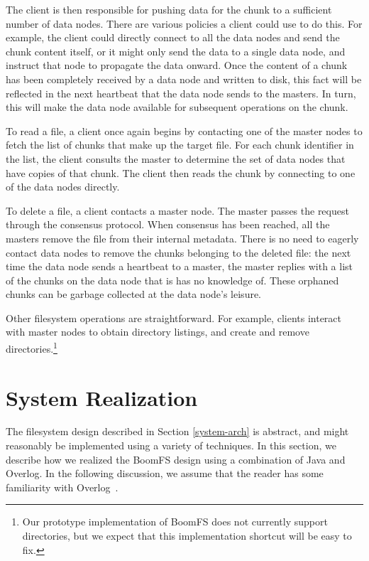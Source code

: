 \documentclass[twocolumn]{article}
\begin{document}
The client is then responsible for pushing data for the chunk to a
sufficient number of data nodes. There are various policies a client
could use to do this. For example, the client could directly connect
to all the data nodes and send the chunk content itself, or it might
only send the data to a single data node, and instruct that node to
propagate the data onward. Once the content of a chunk has been
completely received by a data node and written to disk, this fact will
be reflected in the next heartbeat that the data node sends to the
masters. In turn, this will make the data node available for
subsequent operations on the chunk.

To read a file, a client once again begins by contacting one of the
master nodes to fetch the list of chunks that make up the target
file. For each chunk identifier in the list, the client consults the
master to determine the set of data nodes that have copies of that
chunk. The client then reads the chunk by connecting to one of the
data nodes directly.

To delete a file, a client contacts a master node. The master passes
the request through the consensus protocol. When consensus has been
reached, all the masters remove the file from their internal
metadata. There is no need to eagerly contact data nodes to remove the
chunks belonging to the deleted file: the next time the data node
sends a heartbeat to a master, the master replies with a list of the
chunks on the data node that is has no knowledge of. These orphaned
chunks can be garbage collected at the data node's leisure.

Other filesystem operations are straightforward. For example, clients
interact with master nodes to obtain directory listings, and create
and remove directories.\footnote{Our prototype implementation of
  BoomFS does not currently support directories, but we expect that
  this implementation shortcut will be easy to fix.}

\section{System Realization}
\label{system-realize}
The filesystem design described in Section \ref{system-arch} is
abstract, and might reasonably be implemented using a variety of
techniques. In this section, we describe how we realized the BoomFS
design using a combination of Java and Overlog. In the following
discussion, we assume that the reader has some familiarity with
Overlog~\cite{dn-sigmod}.
\end{document}
